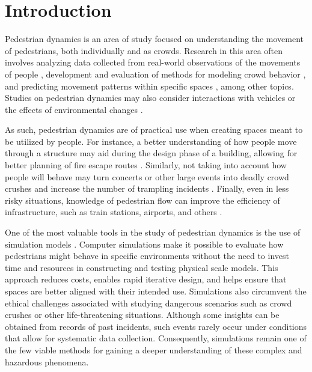 \documentclass[twoside, 11pt]{article}
\begin{document}
\clearpage            %
\null                %
\newpage             %

\mainmatter

\section{Introduction}

Pedestrian dynamics is an area of study focused on understanding the movement of pedestrians, both individually and as crowds. Research in this area often involves analyzing data collected from real-world observations of the movements of people \cite{adrianCrowdsFrontBottlenecks2020}, development and evaluation of methods for modeling crowd behavior \cite{vonkruchtenEmpiricalStudySocial2017}, and predicting movement patterns within specific spaces \cite{10181234}, among other topics. Studies on pedestrian dynamics may also consider interactions with vehicles \cite{liangUnravelingCausesSeoul2024} or the effects of environmental changes \cite{helbingSimulatingDynamicFeatures2000}. 

As such, pedestrian dynamics are of practical use when creating spaces meant to be utilized by people. For instance, a better understanding of how people move through a structure may aid during the design phase of a building, allowing for better planning of fire escape routes \cite{kouskoulisSystematicReviewPedestrian2017}. Similarly, not taking into account how people will behave may turn concerts or other large events into deadly crowd crushes and increase the number of trampling incidents \cite{barrStampedesNewPsychology2024}. Finally, even in less risky situations, knowledge of pedestrian flow can improve the efficiency of infrastructure, such as train stations, airports, and others \cite{tesoriereModellingSimulationPassenger2018}.

One of the most valuable tools in the study of pedestrian dynamics is the use of simulation models \cite{8718399}. Computer simulations make it possible to evaluate how pedestrians might behave in specific environments without the need to invest time and resources in constructing and testing physical scale models. This approach reduces costs, enables rapid iterative design, and helps ensure that spaces are better aligned with their intended use. Simulations also circumvent the ethical challenges associated with studying dangerous scenarios such as crowd crushes or other life-threatening situations. Although some insights can be obtained from records of past incidents, such events rarely occur under conditions that allow for systematic data collection. Consequently, simulations remain one of the few viable methods for gaining a deeper understanding of these complex and hazardous phenomena.
\end{document}
